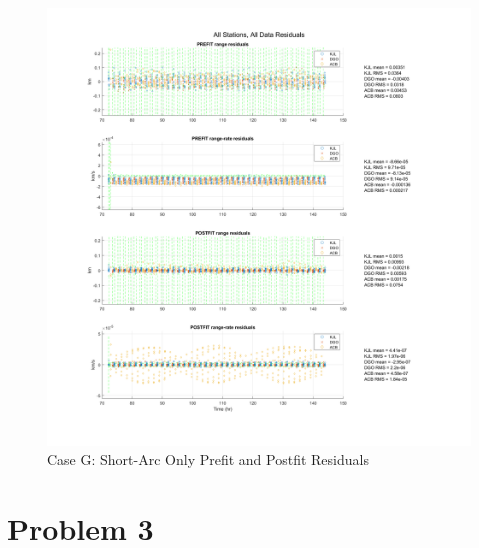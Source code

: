 \documentclass[conf]{new-aiaa}
\begin{document}
\begin{figure}[H]
\centering
\includegraphics[width=\textwidth]{caseG_res.png}
\caption{Case G: Short-Arc Only Prefit and Postfit Residuals}
\end{figure}



\section*{Problem 3}

\begin{center}
\end{center}
\end{document}
